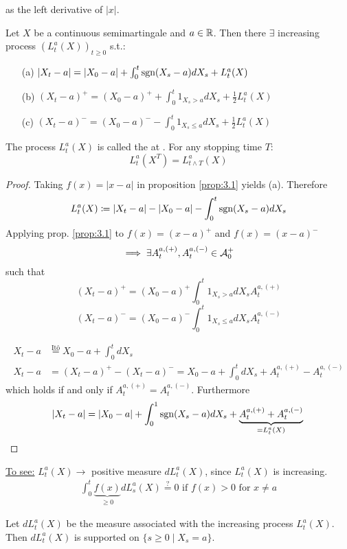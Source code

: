 as the left derivative of $|x|$.

\begin{proposition}\label{prop:3.2}
    Let $X$ be a continuous semimartingale and $a\in\mathbb{R}$. Then there $\exists$ increasing process 
    $(L_t^a(X))_{t\geq 0}$ s.t.:
    \begin{enumerate}
        \item[(a)] $|X_t-a|=|X_0-a|+\int_{0}^t\text{sgn}(X_s-a)dX_s+L_t^a(X)$
        \item[(b)] $(X_t-a)^+ = (X_0-a)^++\int_0^t 1_{X_s>a}dX_s+\frac{1}{2}L_t^a(X)$
        \item[(c)] $(X_t-a)^- = (X_0-a)^--\int_0^t 1_{X_s\leq a}dX_s+\frac{1}{2}L_t^a(X)$
    \end{enumerate}
    The process $L_t^a(X)$ is called the  at .
    For any stopping time $T$:\[L_t^a(X^T)=L_{t\land T}^a(X)\]
\end{proposition}

\begin{proof}
    Taking $f(x)=|x-a|$ in proposition \ref{prop:3.1} yields (a). Therefore 
    \[L_t^a(X)\coloneqq |X_t-a|-|X_0-a|-\int_0^t\text{sgn}(X_s-a)dX_s\]
    Applying prop. \ref{prop:3.1} to $f(x)=(x-a)^+$ and $f(x)=(x-a)^-$
    \[\implies \exists A_t^{a,(+)},A_t^{a,(-)}\in \mathcal{A}_0^+\]
    such that 
    \[(X_t-a)^+=(X_0-a)^+\int_0^t 1_{X_s>a}dX_s A_t^{a,(+)}\]
    \[(X_t-a)^-=(X_0-a)^-\int_0^t 1_{X_s\leq a}dX_s A_t^{a,(-)}\]

    \begin{align*}
        X_t-a&\stackrel{\text{Itô}}{=}X_0-a+\int_0^tdX_s\\
        X_t-a&=(X_t-a)^+-(X_t-a)^-=X_0-a+\int_0^t dX_s + A_t^{a,(+)}- A_t^{a,(-)}
    \end{align*}
    which holds if and only if $ A_t^{a,(+)}= A_t^{a,(-)}$.
    Furthermore 
    \[|X_t-a|=|X_0-a|+\int_0^1\text{sgn}(X_s-a)dX_s+ \underbrace{A_t^{a,(+)}+ A_t^{a,(-)}}_{=L_t^a(X)}\qedhere\]

\end{proof}

\underline{To see:} $L_t^a(X)\to$ positive measure $dL_t^a(X)$, since $L_t^a(X)$ is increasing.
\begin{align*}
    \int_0^t \underbrace{f(x)}_{\geq 0}dL_s^a(X)\stackrel{\text{?}}{=}0\text{ if } f(x)>0\text{ for } x\neq a
\end{align*}   

\begin{proposition}\label{prop:3.3}
    Let $dL_t^a(X)$ be the measure associated with the increasing process $L_t^a(X)$.
    Then $dL_t^a(X)$ is supported on $\{s\geq 0\mid X_s=a\}$.
\end{proposition}

